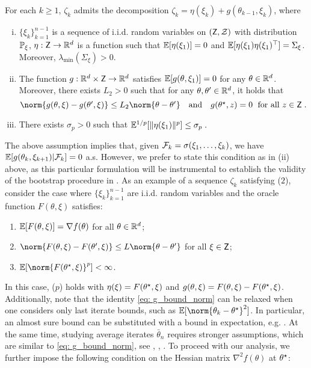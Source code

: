 \begin{assum}[p]
\label{ass:noise_decomposition}
For each $ k \geq 1$, $\zeta_k$ admits the decomposition $\zeta_k = \eta(\xi_k) + g(\theta_{k-1}, \xi_k)$, where
\begin{enumerate}[(i),noitemsep,nolistsep]
    \item  $\{\xi_k\}_{k=1}^{n-1}$ is a sequence of i.i.d. random variables on $(\mathsf{Z},\mathcal{Z})$ with distribution $\mathbb{P}_{\xi}$, $\eta: \mathsf{Z} \rightarrow \mathbb{R}^d$ is a function such that $\mathbb{E}[\eta(\xi_1)]= 0$ and $\mathbb{E}[\eta(\xi_1)\eta(\xi_1)^\top]= \Sigma_{\xi}$. Moreover, $\lambda_{\min}(\Sigma_{\xi}) > 0$.
    \item The function $g: \mathbb{R}^d \times \mathsf{Z} \rightarrow \mathbb{R}^d$ satisfies $\mathbb{E}[g(\theta,\xi_1)]=0$ for any $\theta \in \mathbb{R}^{d}$. Moreover, there exists  $L_2 > 0$ such that for any $\theta, \theta' \in \mathbb{R}^{d}$, it holds that 
    \begin{equation}
        \label{eq: g_bound_norm}
        \textstyle 
        \norm{g(\theta, \xi)-g(\theta', \xi)}\leq L_2\norm{\theta - \theta'} \quad \text{and} \quad g(\thetas, z) = 0\eqsp \text{ for all } z \in \Zset\eqsp. 
    \end{equation}
    \item There exists $\sigma_p > 0$ such that $\mathbb{E}^{1/p}[\|\eta(\xi_1)\|^p]\leq \sigma_p\;.$ 
\end{enumerate}
\end{assum}
The above assumption implies that, given $\mathcal{F}_k = \sigma(\xi_1, \ldots, \xi_k)$, we have $\mathbb{E}[g(\theta_k, \xi_{k+1}) | \mathcal{F}_k] = 0$ a.s. However, we prefer to state this condition as in (ii) above, as this particular formulation will be instrumental to establish the validity of the bootstrap procedure in . As an example of a sequence $\zeta_k$ satisfying ($2$), consider the case where $\{\xi_k\}_{k=1}^{n-1}$ are i.i.d. random variables and the oracle function $F(\theta, \xi)$ satisfies:
\begin{enumerate}
    \item $\mathbb{E}[F(\theta, \xi)] = \nabla f(\theta)$ for all $\theta \in \mathbb{R}^{d}$;
    \item $\norm{F(\theta, \xi) - F(\theta', \xi)} \leq L \norm{\theta - \theta'}$ for all $\xi \in \mathsf{Z}$;
    \item $\PE[\norm{F(\thetas, \xi)}^p] < \infty$.
\end{enumerate}
In this case, ($p$) holds with $\eta(\xi) = F(\theta^\star, \xi)$ and $g(\theta, \xi) = F(\theta, \xi) - F(\theta^\star, \xi)$. Additionally, note that the identity \eqref{eq: g_bound_norm} can be relaxed when one considers only last iterate bounds, such as $\PE[\norm{\theta_k - \thetas}^2]$. In particular, an almost sure bound can be substituted with a bound in expectation, e.g. \cite[Assumption H2]{moulines2011non}. At the same time, studying average iterates $\bar{\theta}_n$ requires stronger assumptions, which are similar to \eqref{eq: g_bound_norm}, see \cite[Assumption H2']{moulines2011non},  \cite{durmus2020biassgd}, \cite{shao2022berry}. To proceed with our analysis, we further impose the following condition on the Hessian matrix $\nabla^2f(\theta)$ at $\theta^\star$:
